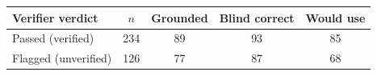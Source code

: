 \begin{tabular}{@{}lcccc@{}}
\toprule
Verifier verdict & $n$ & Grounded & Blind correct & Would use \\
\midrule
Passed (verified) & 234 & 89 & 93 & 85 \\
Flagged (unverified) & 126 & 77 & 87 & 68 \\
\bottomrule
\end{tabular}
